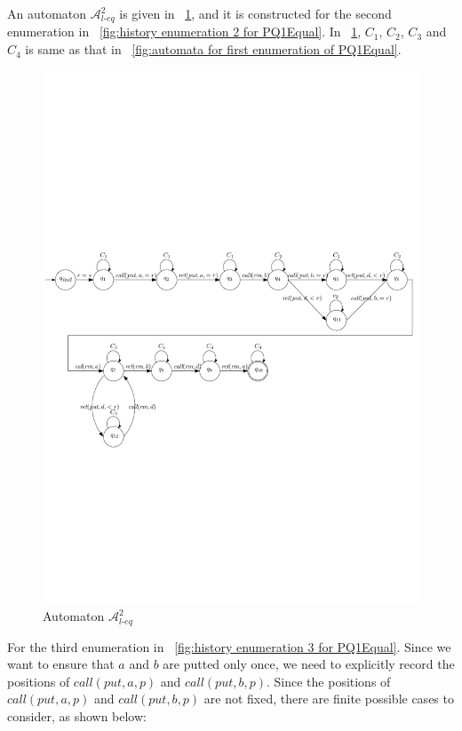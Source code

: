 An automaton $\mathcal{A}_{\textit{l-eq}}^2$ is given in \figurename~\ref{fig:automata for second enumeration of PQ1Equal}, and it is constructed for the second enumeration in \figurename~\ref{fig:history enumeration 2 for PQ1Equal}. In \figurename~\ref{fig:automata for second enumeration of PQ1Equal}, $C_1$, $C_2$, $C_3$ and $C_4$ is same as that in \figurename~\ref{fig:automata for first enumeration of PQ1Equal}.

\begin{figure}[htbp]
  \centering
  \includegraphics[width=0.8 \textwidth]{figures/PIC_AUTO_PQ1Equ-2.pdf}
  \caption{Automaton $\mathcal{A}_{\textit{l-eq}}^2$}
  \label{fig:automata for second enumeration of PQ1Equal}
\end{figure}

For the third enumeration in \figurename~\ref{fig:history enumeration 3 for PQ1Equal}. Since we want to ensure that $a$ and $b$ are putted only once, we need to explicitly record the positions of $\textit{call}(\textit{put},a,p)$ and $\textit{call}(\textit{put},b,p)$. Since the positions of $\textit{call}(\textit{put},a,p)$ and $\textit{call}(\textit{put},b,p)$ are not fixed, there are finite possible cases to consider, as shown below:

